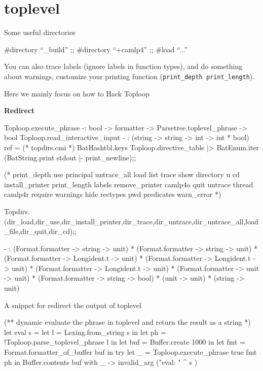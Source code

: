 \section{toplevel}

Some useful directories
\begin{bluetext}
#directory ``_build'' ;; #directory ``+camlp4'' ;; #load ``...''
\end{bluetext}

You can also trace labels (ignore labels in function types), and do
something about warnings, customize your printing function
(\verb|print_depth print_length|).

Here we mainly focus on how to Hack Toploop

\textbf{Redirect}

\begin{ocamlcode}
Toploop.execute_phrase 
-: bool -> formatter -> Parsetree.toplevel_phrase -> bool
Toploop.read_interactive_input
- : (string -> string -> int -> int * bool) ref = (* topdirs.cmi *)
BatHashtbl.keys Toploop.directive_table |> BatEnum.iter (BatString.print stdout |- print_newline);;

(* print_depth use principal untrace_all load list trace show
directory u cd install_printer print_length labels remove_printer
camlp4o quit untrace thread camlp4r require warnings hide rectypes pwd
predicates warn_error *)

Topdirs.(dir_load,dir_use,dir_install_printer,dir_trace,dir_untrace,dir_untrace_all,load_file,dir_quit,dir_cd);;  

- : (Format.formatter -> string -> unit) *
    (Format.formatter -> string -> unit) *
    (Format.formatter -> Longident.t -> unit) *
    (Format.formatter -> Longident.t -> unit) *
    (Format.formatter -> Longident.t -> unit) *
    (Format.formatter -> unit -> unit) *
    (Format.formatter -> string -> bool) * (unit -> unit) * (string -> unit)
\end{ocamlcode}

A snippet for redirect the output of toplevel
\begin{ocamlcode}
(** dynamic evaluate the phrase in toplevel and return the result
    as a string 
*)
let eval s = 
  let l = Lexing.from_string s in 
  let ph = !Toploop.parse_toplevel_phrase l in 
  let buf = Buffer.create 1000 in 
  let fmt = Format.formatter_of_buffer buf in 
  try 
    let _ = Toploop.execute_phrase true fmt ph in 
    Buffer.contents buf 
  with 
      _ -> invalid_arg ("eval: " ^ s )
\end{ocamlcode}

